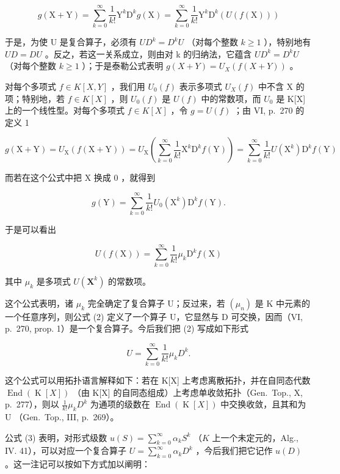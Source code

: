 \[
g (\mathrm{X} + \mathrm{Y}) = \sum_ {k = 0} ^ {\infty} \frac {1}{k !} \mathrm{Y} ^ {k} \mathrm{D} ^ {k} g (\mathrm{X}) = \sum_ {k = 0} ^ {\infty} \frac {1}{k !} \mathrm{Y} ^ {k} \mathrm{D} ^ {k} (U (f (\mathrm{X})))
\]

于是，为使 U 是复合算子，必须有 \(UD^{k} = D^{k}U\) （对每个整数 \(k \geqslant 1\) ），特别地有 \(UD = DU\) 。反之，若这一关系成立，则由对 k 的归纳法，它蕴含 \(UD^{k} = D^{k}U\) （对每个整数 \(k \geqslant 1\) ）；于是泰勒公式表明 \(g(X + Y) = U_{X}(f(X + Y))\) 。

对每个多项式 \(f \in K[X, Y]\) ，我们用 \(U_{0}(f)\) 表示多项式 \(U_{X}(f)\) 中不含 X 的项；特别地，若 \(f \in K[X]\) ，则 \(U_{0}(f)\) 是 \(U(f)\) 中的常数项，而 \(U_{0}\) 是 K{[}X{]} 上的一个线性型。对每个多项式 \(f \in K[X]\) ，令 \(g = U(f)\) ；由 VI, p.~270 的定义 1

\[
g (\mathrm{X} + \mathrm{Y}) = U _ {\mathrm{X}} (f (\mathrm{X} + \mathrm{Y})) = U _ {\mathrm{X}} \left(\sum_ {k = 0} ^ {\infty} \frac {1}{k !} \mathrm{X} ^ {k} \mathrm{D} ^ {k} f (\mathrm{Y})\right) = \sum_ {k = 0} ^ {\infty} \frac {1}{k !} U (\mathrm{X} ^ {k}) \mathrm{D} ^ {k} f (\mathrm{Y})
\]

而若在这个公式中把 X 换成 0 ，就得到

\[
g (\mathrm{Y}) = \sum_ {k = 0} ^ {\infty} \frac {1}{k !} U _ {0} (\mathrm{X} ^ {k}) \mathrm{D} ^ {k} f (\mathrm{Y}).
\]

于是可以看出

\[
U (f (\mathrm{X})) = \sum_ {k = 0} ^ {\infty} \frac {1}{k !} \mu_ {k} \mathrm{D} ^ {k} f (\mathrm{X})\tag{2}
\]

其中 \(\mu_{k}\) 是多项式 \(U(\mathbf{X}^k)\) 的常数项。

这个公式表明，诸 \(\mu_{k}\) 完全确定了复合算子 U；反过来，若 \((\mu_{n})\) 是 K 中元素的一个任意序列，则公式 (2) 定义了一个算子 U，它显然与 D 可交换，因而（VI, p.~270, prop. 1）是一个复合算子。今后我们把 (2) 写成如下形式

\[
U = \sum_ {k = 0} ^ {\infty} \frac {1}{k !} \mu_ {k} D ^ {k}.\tag{3}
\]

这个公式可以用拓扑语言解释如下：若在 K{[}X{]} 上考虑离散拓扑，并在自同态代数 \(\operatorname{End}(\operatorname{K}[X])\) （由 K{[}X{]} 的自同态组成）上考虑单收敛拓扑（Gen.~Top., X, p.~277），则以 \(\frac{1}{k!}\mu_{k}D^{k}\) 为通项的级数在 \(\operatorname{End}(\operatorname{K}[X])\) 中交换收敛，且其和为 U （Gen.~Top., III, p.~269）。

公式 (3) 表明，对形式级数 \(u(S) = \sum_{k=0}^{\infty} \alpha_k S^k\) （\(K\) 上一个未定元的，Alg., IV. 41），可以对应一个复合算子 \(U = \sum_{k=0}^{\infty} \alpha_k D^k\) ，今后我们把它记作 \(u(D)\) 。这一注记可以按如下方式加以阐明：

